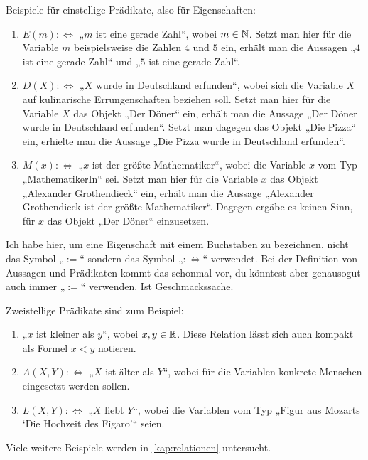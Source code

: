 \begin{bsp}
    Beispiele für einstellige Prädikate, also für Eigenschaften:
    \begin{enumerate}
        \item $E(m):\Leftrightarrow$ „$m$ ist eine gerade Zahl“, wobei $m\in \mathbb N$. Setzt man hier für die Variable $m$ beispielsweise die Zahlen $4$ und $5$ ein, erhält man die Aussagen „$4$ ist eine gerade Zahl“ und „$5$ ist eine gerade Zahl“.
        \item $D(X):\Leftrightarrow$ „$X$ wurde in Deutschland erfunden“, wobei sich die Variable $X$ auf kulinarische Errungenschaften beziehen soll. Setzt man hier für die Variable $X$ das Objekt „Der Döner“ ein, erhält man die Aussage „Der Döner wurde in Deutschland erfunden“. Setzt man dagegen das Objekt „Die Pizza“ ein, erhielte man die Aussage „Die Pizza wurde in Deutschland erfunden“.
        \item $M(x):\Leftrightarrow $ „$x$ ist der größte Mathematiker“, wobei die Variable $x$ vom Typ „MathematikerIn“ sei. Setzt man hier für die Variable $x$ das Objekt „Alexander Grothendieck“ ein, erhält man die Aussage „Alexander Grothendieck ist der größte Mathematiker“. Dagegen ergäbe es keinen Sinn, für $x$ das Objekt „Der Döner“ einzusetzen.
    \end{enumerate}
    Ich habe hier, um eine Eigenschaft mit einem Buchstaben zu bezeichnen, nicht das Symbol „$:=$“ sondern das Symbol „$:\Leftrightarrow$“ verwendet. Bei der Definition von Aussagen und Prädikaten kommt das schonmal vor, du könntest aber genausogut auch immer „$:=$“ verwenden. Ist Geschmackssache.
\end{bsp}


\begin{bsp}
    Zweistellige Prädikate sind zum Beispiel:
    \begin{enumerate}
        \item „$x$ ist kleiner als $y$“, wobei $x,y\in \mathbb R$. Diese Relation lässt sich auch kompakt als Formel $x<y$ notieren.
        \item $A(X,Y):\Leftrightarrow$ „$X$ ist älter als $Y$“, wobei für die Variablen konkrete Menschen eingesetzt werden sollen.
        \item $L(X,Y):\Leftrightarrow$ „$X$ liebt $Y$“, wobei die Variablen vom Typ „Figur aus Mozarts `Die Hochzeit des Figaro'“ seien.
    \end{enumerate}
    Viele weitere Beispiele werden in \cref{kap:relationen} untersucht.
\end{bsp}


